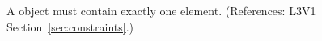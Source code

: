A \Constraint object must contain exactly one 
element.  (References: L3V1 Section~\ref{sec:constraints}.)
